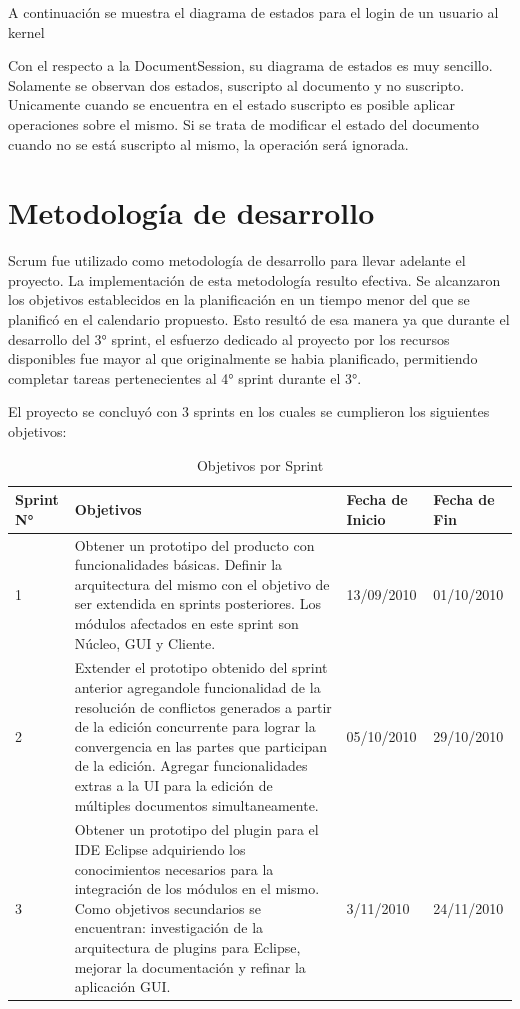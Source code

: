 \documentclass[12pt,a4paper]{article}
\begin{document}
A continuación se muestra el diagrama de estados para el login de un usuario al kernel

Con el respecto a la DocumentSession, su diagrama de estados es muy sencillo. Solamente se observan dos estados, suscripto al
documento y no suscripto. Unicamente cuando se encuentra en el estado suscripto es posible aplicar operaciones sobre el mismo.
Si se trata de modificar el estado del documento cuando no se está suscripto al mismo, la operación será ignorada.


\section{Metodología de desarrollo}

Scrum fue utilizado como metodología de desarrollo para llevar adelante el proyecto. La implementación de esta metodología
resulto efectiva. Se alcanzaron los objetivos establecidos en la planificación en un tiempo menor del que se planificó en
el calendario propuesto. Esto resultó de esa manera ya que durante el desarrollo del 3° sprint, el esfuerzo dedicado al proyecto
por los recursos disponibles fue mayor al que originalmente se habia planificado, permitiendo completar tareas pertenecientes
al 4° sprint durante el 3°.

El proyecto se concluyó con 3 sprints en los cuales se cumplieron los siguientes objetivos:

\begin{table}
    \begin{tabular}{ | l | p{6.5cm} | p{2cm} | p{2cm} | }
    \hline
	Sprint N° & Objetivos & Fecha de Inicio & Fecha de Fin \\ \hline

	1 & Obtener un prototipo del producto con funcionalidades básicas. Definir la arquitectura del mismo con el
	objetivo de ser extendida en sprints posteriores. Los módulos afectados en este sprint son Núcleo, GUI y Cliente.
	& 13/09/2010 & 01/10/2010 \\ \hline

	2 & Extender el prototipo obtenido del sprint anterior agregandole funcionalidad de la resolución de conflictos
	generados a partir de la edición concurrente para lograr la convergencia en las partes que participan de la edición.
	Agregar funcionalidades extras a la UI para la edición de múltiples documentos simultaneamente.
	& 05/10/2010 & 29/10/2010 \\ \hline

	3 & Obtener un prototipo del plugin para el IDE Eclipse adquiriendo los conocimientos necesarios para la integración de los
	módulos en el mismo. Como objetivos secundarios se encuentran: investigación de la arquitectura de plugins para Eclipse, mejorar
	la documentación y refinar la aplicación GUI.
	& 3/11/2010 & 24/11/2010 \\ \hline

    \end{tabular}
    \caption{\label{soluciones_comparacion} Objetivos por Sprint}
\end{table}
\end{document}
